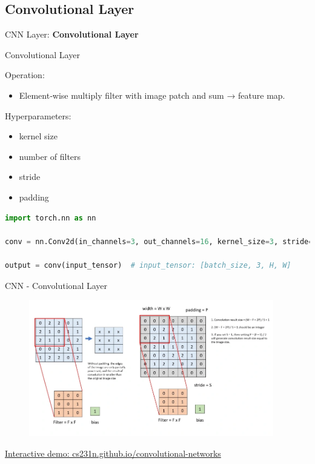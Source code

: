 \subsection{Convolutional Layer}
\begin{frame}{}
    \LARGE CNN Layer: \textbf{Convolutional Layer}
\end{frame}
\begin{frame}[fragile]{Convolutional Layer}
\begin{block}{Operation:}
    \begin{itemize}
        \item Element‑wise multiply filter with image patch and sum → feature map.
    \end{itemize}
\end{block}

\begin{block}{Hyperparameters:}
    \begin{itemize}
        \item kernel size
        \item number of filters
        \item stride
        \item padding
    \end{itemize}
\end{block}

\begin{lstlisting}[language=Python, caption={Code snippet (PyTorch)}, basicstyle=\ttfamily\footnotesize]
import torch.nn as nn

conv = nn.Conv2d(in_channels=3, out_channels=16, kernel_size=3, stride=1, padding=1)

output = conv(input_tensor)  # input_tensor: [batch_size, 3, H, W]
\end{lstlisting}
\end{frame}  

\begin{frame}{CNN - Convolutional Layer}
    \begin{figure}
    \centering
    \includegraphics[width=0.95\textwidth,height=0.95\textheight,keepaspectratio]{images/cnn/convolutional-layer.png}
    \end{figure}

    \href{https://cs231n.github.io/convolutional-networks/}{Interactive demo: cs231n.github.io/convolutional-networks}
\end{frame}

